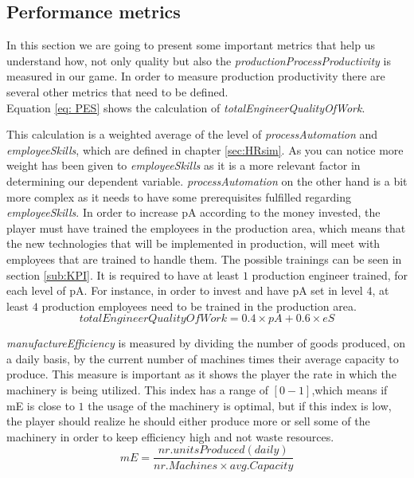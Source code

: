 \subsection{Performance metrics}
\label{sub:PM}
In this section we are going to present some important metrics that help us understand how, not only quality but also the \textit{productionProcessProductivity} is measured in our game. In order to measure production productivity there are several other metrics that need to be defined. \\
Equation \ref{eq: PES} shows the calculation of \textit{totalEngineerQualityOfWork}.

This calculation is a weighted average of the level of \textit{processAutomation} and \textit{employeeSkills}, which are defined in chapter \ref{sec:HRsim}. As you can notice more weight has been given to \textit{employeeSkills} as it is a more relevant factor in determining our dependent variable. \textit{processAutomation} on the other hand is a bit more complex as it needs to have some prerequisites fulfilled regarding \textit{employeeSkills}. In order to increase pA according to the money invested, the player must have trained the employees in the production area, which means that the new technologies that will be implemented in production, will meet with employees that are trained to handle them. The possible trainings can be seen in section \ref{sub:KPI}. It is required to have at least $1$ production engineer trained, for each level of pA. For instance, in order to invest and have pA set in level $4$, at least $4$ production employees need to be trained in the production area.
\begin{equation}
totalEngineerQualityOfWork = 0.4\times pA + 0.6\times eS
\label{eq: PES}
\end{equation}

\textit{manufactureEfficiency} is measured by dividing the number of goods produced, on a daily basis, by the current number of machines times their average capacity to produce. This measure is important as it shows the player the rate in which the machinery is being utilized. This index has a range of $[0-1]$,which means if mE is close to $1$ the usage of the machinery is optimal, but if this index is low, the player should realize he should either produce more or sell some of the machinery in order to keep efficiency high and not waste resources.
\begin{equation}
mE= \frac{nr. units Produced(daily)}{nr. Machines\times avg. Capacity}  
\label{eq: ME}
\end{equation}

